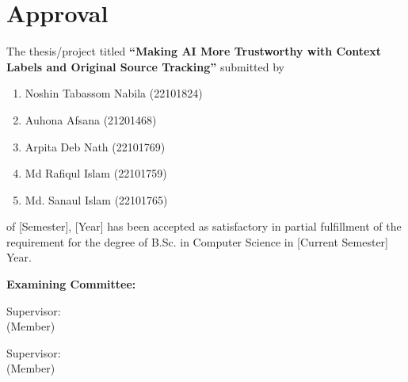 \section*{Approval}

The thesis/project titled \textbf{“Making AI More Trustworthy with Context Labels and Original Source Tracking”} submitted by 
\begin{enumerate}
  \item Noshin Tabassom Nabila (22101824)
  \item Auhona Afsana (21201468)
  \item Arpita Deb Nath (22101769) 
  \item Md Rafiqul Islam (22101759)
  \item Md. Sanaul Islam (22101765)
\end{enumerate}

of [Semester], [Year] has been accepted as satisfactory in partial fulfillment of the requirement for the degree of B.Sc. in Computer Science in [Current Semester] Year.

\vspace{0.5cm}
\textbf{Examining Committee:}

\vspace{1cm}

Supervisor:\\
(Member)
\begin{center}
    \hspace{7cm}  \hspace{1cm} 
\end{center}
Supervisor:\\
(Member)
\begin{center}
    \hspace{7cm}  \hspace{1cm} 
\end{center}

\vspace{0.3cm}
\newpage


